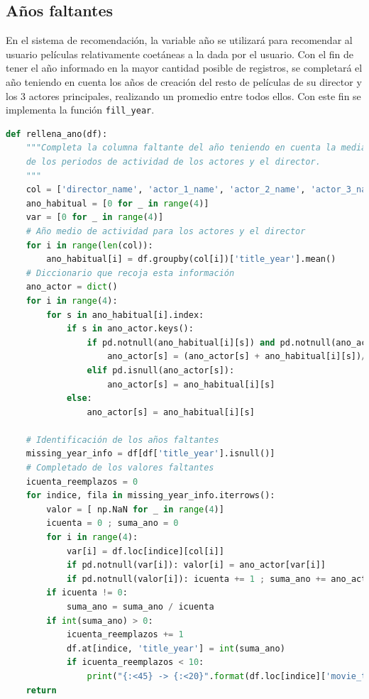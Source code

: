 \subsection{Años faltantes}

En el sistema de recomendación, la variable año se utilizará para recomendar al usuario películas relativamente coetáneas a la dada por el usuario. Con el fin de tener el año informado en la mayor cantidad posible de registros, se completará el año teniendo en cuenta los años de creación del resto de películas de su director y los 3 actores principales, realizando un promedio entre todos ellos. Con este fin se implementa la función \texttt{fill\_year}.

\begin{lstlisting}[language=Python, caption={Completado de la variable año en el dataset utilizando el promedio de los años de las películas de su director y actores principales. Se da por hecho que los directores y actores tienen un periodo de actividad determinado. Se promedia estos años para obtener el año más probable de producción de la película y se introduce en el dataframe en caso de que el año no esté informado para ese registro.}]
def rellena_ano(df):
    """Completa la columna faltante del año teniendo en cuenta la media
    de los periodos de actividad de los actores y el director.
    """
    col = ['director_name', 'actor_1_name', 'actor_2_name', 'actor_3_name']
    ano_habitual = [0 for _ in range(4)]
    var = [0 for _ in range(4)]
    # Año medio de actividad para los actores y el director
    for i in range(len(col)):
        ano_habitual[i] = df.groupby(col[i])['title_year'].mean()
    # Diccionario que recoja esta información
    ano_actor = dict()
    for i in range(4):
        for s in ano_habitual[i].index:
            if s in ano_actor.keys():
                if pd.notnull(ano_habitual[i][s]) and pd.notnull(ano_actor[s]):
                    ano_actor[s] = (ano_actor[s] + ano_habitual[i][s])/2
                elif pd.isnull(ano_actor[s]):
                    ano_actor[s] = ano_habitual[i][s]
            else:
                ano_actor[s] = ano_habitual[i][s]
        
    # Identificación de los años faltantes
    missing_year_info = df[df['title_year'].isnull()]
    # Completado de los valores faltantes
    icuenta_reemplazos = 0
    for indice, fila in missing_year_info.iterrows():
        valor = [ np.NaN for _ in range(4)]
        icuenta = 0 ; suma_ano = 0
        for i in range(4):            
            var[i] = df.loc[indice][col[i]]
            if pd.notnull(var[i]): valor[i] = ano_actor[var[i]]
            if pd.notnull(valor[i]): icuenta += 1 ; suma_ano += ano_actor[var[i]]
        if icuenta != 0: 
            suma_ano = suma_ano / icuenta 
        if int(suma_ano) > 0:
            icuenta_reemplazos += 1
            df.at[indice, 'title_year'] = int(suma_ano)
            if icuenta_reemplazos < 10: 
                print("{:<45} -> {:<20}".format(df.loc[indice]['movie_title'],int(suma_ano)))
    return
\end{lstlisting}


